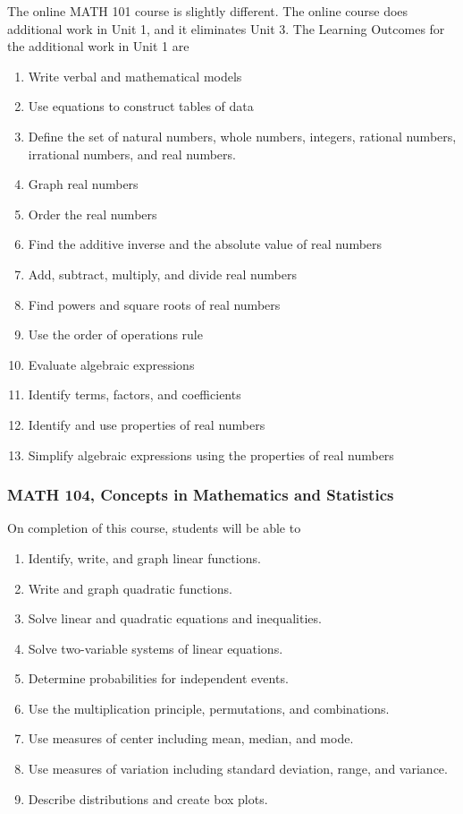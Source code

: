 \documentclass[10pt]{article}
\newenvironment{alphalist}{
\begin{enumerate}[label=(\arabic*),widest=107 ,leftmargin=25pt, itemsep=0pt]}
{\end{enumerate}}
\begin{document}
\noindent The online MATH  101 course is slightly different. The online course does additional work in Unit 1, and
it eliminates Unit 3. The Learning Outcomes for the additional work in Unit 1 are
 
\begin{alphalist}
    \item Write verbal and mathematical models
    \item Use equations to construct tables of data
    \item Define the set of natural numbers, whole numbers, integers, rational numbers, irrational numbers, and real numbers.
    \item Graph real numbers
    \item Order the real numbers
    \item Find the additive inverse and the absolute value of real numbers
    \item Add, subtract, multiply, and divide real numbers
    \item Find powers and square roots of real numbers
    \item Use the order of operations rule
    \item Evaluate algebraic expressions
    \item Identify terms, factors, and coefficients
    \item Identify and use properties of real numbers
    \item Simplify algebraic expressions using the properties of real numbers

\end{alphalist}



\subsubsection*{MATH 104,  Concepts in Mathematics and Statistics}


On completion of this course, students will be able to
\begin{alphalist}
    \item Identify, write, and graph linear functions.
    \item Write and graph quadratic functions.
    \item Solve linear and quadratic equations and inequalities.
    \item Solve two-variable systems of linear equations.
    \item Determine probabilities for independent events.
    \item Use the multiplication principle, permutations, and combinations.
    \item Use measures of center including mean, median, and mode.
    \item Use measures of variation including standard deviation, range, and variance.
    \item Describe distributions and create box plots.
\end{alphalist}
\end{document}
